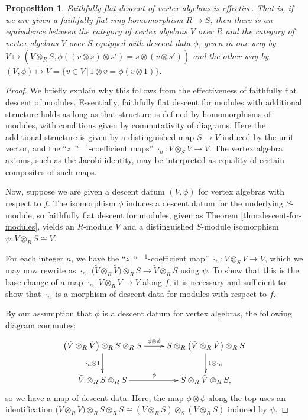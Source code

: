 \documentclass[11pt]{article}
\newtheorem{prop}[thm]{Proposition}
\theoremstyle{definition}
\begin{document}
\begin{prop} \label{prop:descent-for-vertex-algebras}Faithfully flat descent of vertex algebras is effective. That is, if we are given a faithfully flat ring homomorphism $R \to S$, then there is an equivalence between the category of vertex algebras $\tilde{V}$ over $R$ and the category of vertex algebras $V$ over $S$ equipped with descent data $\phi$, given in one way by $\tilde{V} \mapsto (\tilde{V} \otimes_{R} S, \phi((v \otimes s) \otimes s') = s \otimes (v \otimes s'))$ and the other way by $(V, \phi) \mapsto \tilde{V} = \{v \in V \,|\, 1 \otimes v = \phi(v \otimes 1)\}$.
\end{prop}
\begin{proof} We briefly explain why this follows from the effectiveness of faithfully flat descent of modules. Essentially, faithfully flat descent for modules with additional structure holds as long as that structure is defined by homomorphisms of modules, with conditions given by commutativity of diagrams. Here the additional structure is given by a distinguished map $S \to V$ induced by the unit vector, and the ``$z^{-n-1}$-coefficient maps'' $\cdot_n\colon V \otimes_S V \to V$. The vertex algebra axioms, such as the Jacobi identity, may be interpreted as equality of certain composites of such maps.

Now, suppose we are given a descent datum $(V, \phi)$ for vertex algebras with respect to $f$. The isomorphism $\phi$ induces a descent datum for the underlying $S$-module, so faithfully flat descent for modules, given as Theorem \ref{thm:descent-for-modules}, yields an $R$-module $\tilde{V}$ and a distinguished $S$-module isomorphism $\psi\colon \tilde{V} \otimes_{R} S \cong V$.

For each integer $n$, we have the ``$z^{-n-1}$-coefficient map'' $\cdot_n\colon V \otimes_S V \to V$, which we may now rewrite as $\cdot_n\colon \big(\tilde{V} \otimes_{R} \tilde{V}\big) \otimes_{R} S \to \tilde{V} \otimes_{R} S$ using $\psi$. To show that this is the base change of a map $\tilde{\cdot}_n\colon \tilde{V} \otimes_{R} \tilde{V} \to \tilde{V}$ along $f$, it is necessary and sufficient to show that $\cdot_n$ is a morphism of descent data for modules with respect to $f$.

By our assumption that $\phi$ is a descent datum for vertex algebras, the following diagram commutes:
\begin{gather*} \xymatrix{ \big(\tilde{V} \otimes_{R} \tilde{V}\big) \otimes_{R} S \otimes_{R} S \ar[r]^{\phi \otimes \phi} \ar[d]_{\cdot_n \otimes 1} & S \otimes_{R} \big(\tilde{V} \otimes_{R} \tilde{V}\big) \otimes_{R} S \ar[d]^{1 \otimes \cdot_n} \\
\tilde{V} \otimes_{R} S \otimes_{R} S \ar[r]^{\phi} & S \otimes_{R} \tilde{V} \otimes_{R} S,} \end{gather*}
so we have a map of descent data. Here, the map $\phi \otimes \phi$ along the top uses an identification $\big(\tilde{V} \otimes_{R} \tilde{V}\big) \otimes_{R} S \otimes_{R} S \cong (V \otimes_{R} S) \otimes_S (V \otimes_{R} S)$ induced by $\psi$.


\end{proof}
\end{document}
